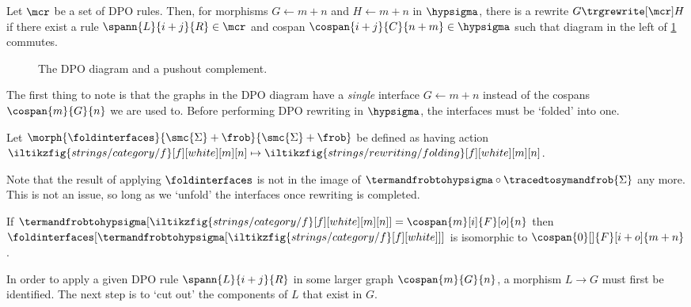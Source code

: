 \begin{definition}\label{def:dpo}
    Let \(\mcr\) be a set of DPO rules.
    Then, for morphisms \(G \leftarrow m+n\) and \(H \leftarrow m+n\) in
    \(\hypsigma\), there is a rewrite \(G \trgrewrite[\mcr] H\) if there
    exist a rule \(
        \spann{L}{i+j}{R} \in \mcr
    \) and cospan \(
        \cospan{i+j}{C}{n+m} \in \hypsigma
    \) such that diagram in the left of \cref{fig:dpo} commutes.
\end{definition}

\begin{figure}
    \centering
    \raisebox{1em}{}
    \qquad
    
    \caption{The DPO diagram and a pushout complement.}
    \label{fig:dpo}
\end{figure}

The first thing to note is that the graphs in the DPO diagram have a
\emph{single} interface \(G \leftarrow m + n\) instead of the cospans \(
    \cospan{m}{G}{n}
\) we are used to.
Before performing DPO rewriting in \(\hypsigma\), the interfaces must be
`folded' into one.

\begin{definition}
    Let \(\morph{\foldinterfaces}{\smc{\Sigma} + \frob}{\smc{\Sigma} + \frob}\)
    be defined as having action \(
        \iltikzfig{strings/category/f}[f][white][m][n]
        \mapsto
        \iltikzfig{strings/rewriting/folding}[f][white][m][n]
    \).
\end{definition}

Note that the result of applying \(\foldinterfaces\) is not in the image of \(
    \termandfrobtohypsigma \circ \tracedtosymandfrob{\Sigma}
\) any more.
This is not an issue, so long as we `unfold' the interfaces once rewriting is
completed.

\begin{proposition}
    If \(
        \termandfrobtohypsigma[\iltikzfig{strings/category/f}[f][white][m][n]]
        =
        \cospan{m}[i]{F}[o]{n}
    \) then \(
        \foldinterfaces[
            \termandfrobtohypsigma[\iltikzfig{strings/category/f}[f][white]]
        ]
    \) is isomorphic to \(
        \cospan{0}[]{F}[i+o]{m+n}
    \).
\end{proposition}

In order to apply a given DPO rule \(\spann{L}{i+j}{R}\) in some larger
graph \(\cospan{m}{G}{n}\), a morphism \(L \to G\) must first be identified.
The next step is to `cut out' the components of \(L\) that exist in \(G\).

